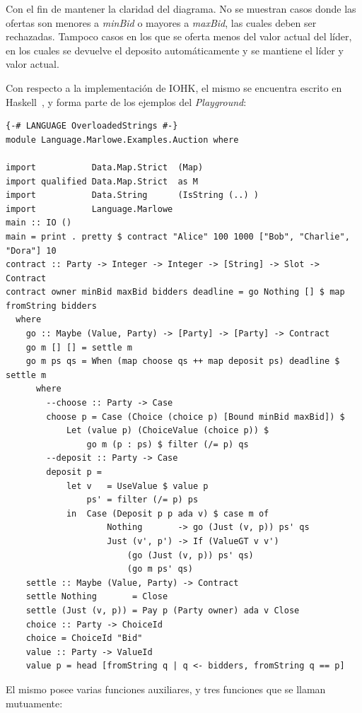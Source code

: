 \documentclass[12pt]{book}
\begin{document}
Con el fin de mantener la claridad del diagrama. No se muestran casos donde las ofertas son menores a \textit{minBid} o mayores a \textit{maxBid}, las cuales deben ser rechazadas. Tampoco casos en los que se oferta menos del valor actual del líder, en los cuales se devuelve el deposito automáticamente y se mantiene el líder y valor actual.


Con respecto a la implementación de IOHK, el mismo se encuentra escrito en Haskell~\cite{auction_haskell}, y forma parte de los ejemplos del \textit{Playground}:

\begin{lstlisting}[style=Haskell-cardano, caption=Contrato \textit{Auction} escrito en Marlowe]
{-# LANGUAGE OverloadedStrings #-}
module Language.Marlowe.Examples.Auction where

import           Data.Map.Strict  (Map)
import qualified Data.Map.Strict  as M
import           Data.String      (IsString (..) )
import           Language.Marlowe
main :: IO ()
main = print . pretty $ contract "Alice" 100 1000 ["Bob", "Charlie", "Dora"] 10
contract :: Party -> Integer -> Integer -> [String] -> Slot -> Contract
contract owner minBid maxBid bidders deadline = go Nothing [] $ map fromString bidders
  where
    go :: Maybe (Value, Party) -> [Party] -> [Party] -> Contract
    go m [] [] = settle m
    go m ps qs = When (map choose qs ++ map deposit ps) deadline $ settle m
      where
        --choose :: Party -> Case
        choose p = Case (Choice (choice p) [Bound minBid maxBid]) $
            Let (value p) (ChoiceValue (choice p)) $
                go m (p : ps) $ filter (/= p) qs
        --deposit :: Party -> Case
        deposit p =
            let v   = UseValue $ value p
                ps' = filter (/= p) ps
            in  Case (Deposit p p ada v) $ case m of
                    Nothing       -> go (Just (v, p)) ps' qs
                    Just (v', p') -> If (ValueGT v v')
                        (go (Just (v, p)) ps' qs)
                        (go m ps' qs)
    settle :: Maybe (Value, Party) -> Contract
    settle Nothing       = Close
    settle (Just (v, p)) = Pay p (Party owner) ada v Close
    choice :: Party -> ChoiceId
    choice = ChoiceId "Bid"
    value :: Party -> ValueId
    value p = head [fromString q | q <- bidders, fromString q == p]
\end{lstlisting}

El mismo posee varias funciones auxiliares, y tres funciones que se llaman mutuamente:
\end{document}
